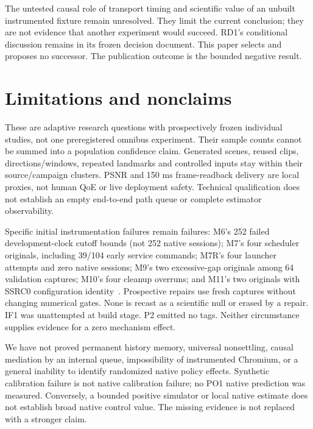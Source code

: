 \documentclass[10pt]{article}
\begin{document}
The untested causal role of transport timing and scientific value of an unbuilt
instrumented fixture remain unresolved. They limit the current conclusion;
they are not evidence that another experiment would succeed. RD1's conditional
discussion remains in its frozen decision document. This paper selects and
proposes no successor. The publication outcome is the bounded negative result.

\section{Limitations and nonclaims}
\label{sec:limits}
These are adaptive research questions with prospectively frozen individual
studies, not one preregistered omnibus experiment. Their sample counts cannot
be summed into a population confidence claim. Generated scenes, reused clips,
directions/windows, repeated landmarks and controlled inputs stay within their
source/campaign clusters. PSNR and 150 ms frame-readback delivery are local
proxies, not human QoE or live deployment safety. Technical qualification does
not establish an empty end-to-end path queue or complete estimator observability.

Specific initial instrumentation failures remain failures: M6's 252 failed
development-clock cutoff bounds (not 252 native sessions); M7's four scheduler
originals, including 39/104 early service commands; M7R's four launcher attempts
and zero native sessions; M9's two excessive-gap originals among 64 validation
captures; M10's four cleanup overruns; and M11's two originals with SSRC0
configuration identity~\cite{m6,m7,m7r,m9,m10,m11}. Prospective repairs use fresh
captures without changing numerical gates. None is recast as a scientific null
or erased by a repair. IF1 was unattempted at build stage. P2 emitted no tags.
Neither circumstance supplies evidence for a zero mechanism effect.

We have not proved permanent history memory, universal nonsettling, causal
mediation by an internal queue, impossibility of instrumented Chromium, or a
general inability to identify randomized native policy effects. Synthetic
calibration failure is not native calibration failure; no PO1 native prediction
was measured. Conversely, a bounded positive simulator or local native estimate
does not establish broad native control value. The missing evidence is not
replaced with a stronger claim.
\end{document}
